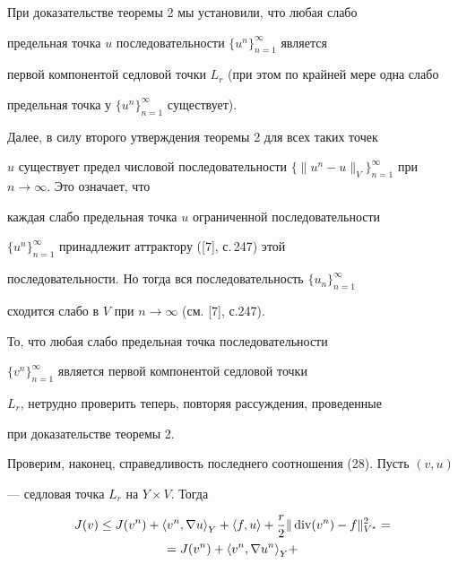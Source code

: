  


\begin{pf} При доказательстве теоремы 2 мы установили, что любая слабо 


предельная точка $u$ последовательности $\{u^{n}\}_{n=1}^{\infty}$ является 


первой компонентой седловой точки $L_{r}$ (при этом по крайней мере одна слабо


предельная точка у $\{u^{n}\}_{n=1}^{\infty}$ существует).


 


Далее, в силу второго утверждения теоремы 2 для всех таких точек


$u$ существует предел числовой последовательности $\{\|u^{n}-u 


\|_{V}\}_{n=1}^{\infty}$ при $n \to \infty $. Это означает, что


каждая слабо предельная точка $u$ ограниченной последовательности 


$\{u^{n}\}_{n=1}^{\infty}$ принадлежит аттрактору ([7], с.\,247) этой 


последовательности. Но тогда вся последовательность $\{u_{n}\}_{n=1}^{\infty}$


сходится слабо в $V$ при $n \to \infty $ (см. [7], с.247).


 


То, что любая слабо предельная точка последовательности


$\{v^{n}\}_{n=1}^{\infty}$ является первой компонентой седловой точки 


$L_{r}$, нетрудно проверить теперь, повторяя рассуждения, проведенные 


при доказательстве теоремы 2.


 


Проверим, наконец, справедливость последнего соотношения (28). Пусть $(v,u)$ 


--- седловая точка $L_{r}$ на $Y \times V$. Тогда


\begin{multline*}


J(v) \le J(v^{n}) + {\langle v^{n},\nabla u \rangle}_{Y} 


+ {\langle f,u \rangle} + \frac{r}{2} 


\|\Div (v^{n}) - f\|^{2}_{V^{*}} = \\


= J(v^{n}) + {\langle v^{n},\nabla u^{n} \rangle}_{Y} + 



\end{multline*}
\end{pf}
